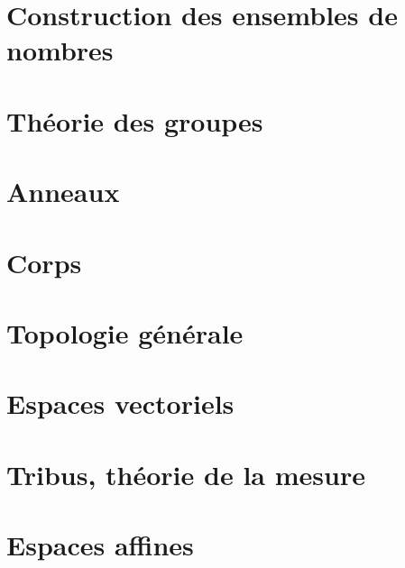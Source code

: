 \emptyInputPath
{}



\chapter{Construction des ensembles de nombres}


\chapter{Théorie des groupes}



\chapter{Anneaux}


\chapter{Corps}





\chapter{Topologie générale}



\chapter{Espaces vectoriels}










\chapter{Tribus, théorie de la mesure}





\chapter{Espaces affines}


